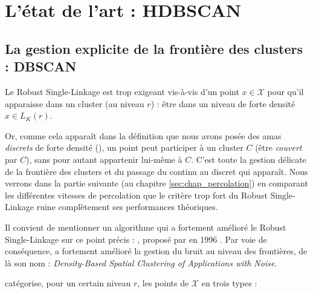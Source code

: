 \section{L'état de l'art : HDBSCAN}
\label{sec:hdbscan}

\subsection{La gestion explicite de la frontière des clusters : DBSCAN}
\label{sec:dbscan}

Le Robust Single-Linkage est trop exigeant vis-à-vis d'un point $x \in \mathcal X$ pour qu'il apparaisse dans un cluster (au niveau $r$) : être dans un niveau de forte densité $x \in L_K(r)$. 

Or, comme cela apparaît dans la définition que nous avons posée des amas \emph{discrets} de forte densité (), un point peut participer à un cluster $C$ (être \emph{couvert} par $C$), sans pour autant appartenir lui-même à $C$. 
C'est toute la gestion délicate de la frontière des clusters et du passage du continu au discret qui apparaît.
Nous verrons dans la partie suivante (au chapitre \ref{sec:chap_percolation}) en comparant les différentes vitesses de percolation que le critère trop fort du Robust Single-Linkage ruine complètement ses performances théoriques.



Il convient de mentionner un algorithme qui a fortement amélioré le Robust Single-Linkage sur ce point précis : \DBSCAN, proposé par  \etal en 1996 \cite{DBSCAN}.
Par voie de conséquence, \DBSCAN a fortement amélioré la gestion du bruit au niveau des frontières, de là son nom : \emph{Density-Based Spatial Clustering of Applications with Noise}. 


\DBSCAN catégorise, pour un certain niveau $r$, les points de $\mathcal{X}$ en trois types :

